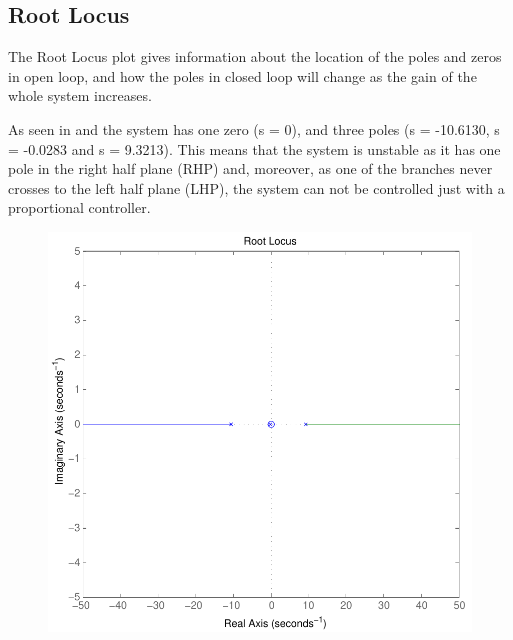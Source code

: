 \subsection{Root Locus}
The Root Locus plot gives information about the location of the poles and zeros in open loop, and how the poles in closed loop will change as the gain of the whole system increases.

As seen in  and  the system has one zero (s = 0), and three poles (s = -10.6130, s = -0.0283 and s = 9.3213). This means that the system is unstable as it has one pole in the right half plane (RHP) and, moreover, as one of the branches never crosses to the left half plane (LHP), the system can not be controlled just with a proportional controller.

\begin{minipage}{\linewidth}
	\begin{minipage}{0.53\linewidth}
		\begin{figure}[H]
			\includegraphics[scale=.4]{figures/rlocusCubli}
			\label{rlocusCubli}
		\end{figure}\vspace{-5mm}
	\end{minipage}
	\hspace{0.03\linewidth}
	\begin{minipage}{0.53\linewidth}

\end{minipage}
\end{minipage}
